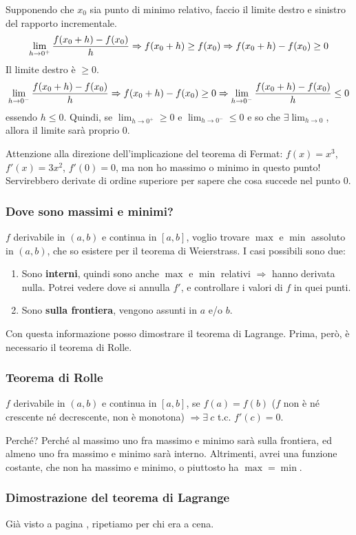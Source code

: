 \documentclass[12pt,a4paper]{article}
\begin{document}
Supponendo che $x_0$ sia punto di minimo relativo, faccio il limite destro e sinistro del rapporto incrementale.
$$
\lim_{h \to 0^+} {f(x_0+h) - f(x_0) \over h} \Rightarrow
f(x_0+h) \geq f(x_0) \Rightarrow f(x_0+h) - f(x_0) \geq 0
$$
Il limite destro \`e $\geq 0$.
$$
\lim_{h \to 0^-} {f(x_0+h) - f(x_0) \over h} \Rightarrow
f(x_0+h) - f(x_0) \geq 0 \Rightarrow 
\lim_{h \to 0^-} {f(x_0+h) - f(x_0) \over h} \leq 0
$$
essendo $h \leq 0$. Quindi, se $\lim_{h \to 0^+} \geq 0$ e $\lim_{h \to 0^-}
\leq 0$ e so che $\exists \lim_{h \to 0}$, allora il limite sar\`a proprio 0.

Attenzione alla direzione dell'implicazione del teorema di Fermat:
$f(x) = x^3$, $f'(x) = 3x^2$, $f'(0) = 0$, ma non ho massimo o minimo
in questo punto! Servirebbero derivate di ordine superiore per sapere che cosa
succede nel punto $0$.

\subsubsection{Dove sono massimi e minimi?}
$f$ derivabile in $(a,b)$ e continua in $[a,b]$, voglio trovare $\max$ e $\min$
assoluto in $(a,b)$, che so esistere per il teorema di Weierstrass. I casi
possibili sono due:
\begin{enumerate}
\item   Sono \textbf{interni}, quindi sono anche $\max$ e $\min$ relativi
        $\Rightarrow$ hanno derivata nulla. Potrei vedere dove si annulla $f'$,
        e controllare i valori di $f$ in quei punti.
\item   Sono \textbf{sulla frontiera}, vengono assunti in $a$ e/o $b$.
\end{enumerate}
Con questa informazione posso dimostrare il teorema di Lagrange. Prima,
per\`o, \`e necessario il teorema di Rolle.

\subsubsection{Teorema di Rolle}
$f$ derivabile in $(a,b)$ e continua in $[a,b]$, se $f(a) = f(b)$ ($f$ non 
\`e n\'e crescente n\'e decrescente, non \`e monotona) $\Rightarrow \exists
\ c$ t.c. $f'(c) = 0$.

Perch\'e? Perch\'e al massimo uno fra massimo e minimo sar\`a sulla frontiera,
ed almeno uno fra massimo e minimo sar\`a interno. Altrimenti, avrei una 
funzione costante, che non ha massimo e minimo, o piuttosto ha $\max = \min$.

\subsubsection{Dimostrazione del teorema di Lagrange}
Gi\`a visto a pagina \pageref{lagrange}, ripetiamo per chi era a cena.
\end{document}
